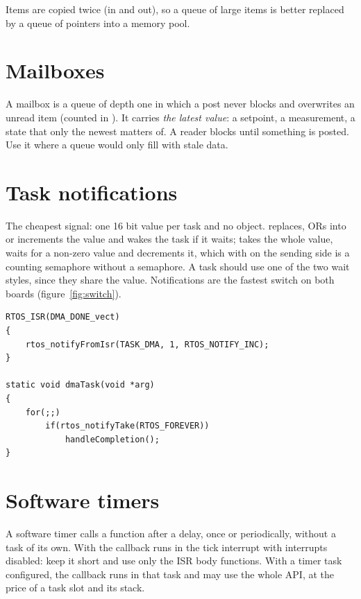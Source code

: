 Items are copied twice (in and out), so a queue of large items is better replaced by a
queue of pointers into a memory pool.

\section{Mailboxes}

A mailbox is a queue of depth one in which a post never blocks and overwrites an unread
item (counted in ). It carries \emph{the latest value}: a setpoint, a
measurement, a state that only the newest matters of. A reader blocks until something is
posted. Use it where a queue would only fill with stale data.

\section{Task notifications}

The cheapest signal: one 16 bit value per task and no object. 
replaces, ORs into or increments the value and wakes the task if it waits;
 takes the whole value,  waits for a
non-zero value and decrements it, which with  on the sending side
is a counting semaphore without a semaphore. A task should use one of the two wait styles,
since they share the value. Notifications are the fastest switch on both boards
(figure~\ref{fig:switch}).

\begin{lstlisting}
RTOS_ISR(DMA_DONE_vect)
{
    rtos_notifyFromIsr(TASK_DMA, 1, RTOS_NOTIFY_INC);
}

static void dmaTask(void *arg)
{
    for(;;)
        if(rtos_notifyTake(RTOS_FOREVER))
            handleCompletion();
}
\end{lstlisting}

\section{Software timers}

A software timer calls a function after a delay, once or periodically, without a task of
its own. With  the callback runs in the tick
interrupt with interrupts disabled: keep it short and use only the ISR body functions.
With a timer task configured, the callback runs in that task and may use the whole API,
at the price of a task slot and its stack.

